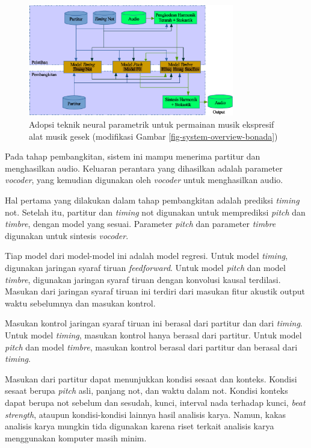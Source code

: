 \begin{figure}[h]
    \centering
    \includegraphics[width=0.8\textwidth]{resources/system-overview.eps}
    \caption{Adopsi teknik neural parametrik untuk permainan musik ekspresif alat musik gesek (modifikasi Gambar \ref{fig-system-overview-bonada})}\label{fig-system-overview}
\end{figure}

Pada tahap pembangkitan, sistem ini mampu menerima partitur dan menghasilkan audio. Keluaran perantara yang dihasilkan adalah parameter \textit{vocoder}, yang kemudian digunakan oleh \textit{vocoder} untuk menghasilkan audio.

Hal pertama yang dilakukan dalam tahap pembangkitan adalah prediksi \textit{timing} not. Setelah itu, partitur dan \textit{timing} not digunakan untuk memprediksi \textit{pitch} dan \textit{timbre}, dengan model yang sesuai. Parameter \textit{pitch} dan parameter \textit{timbre} digunakan untuk sintesis \textit{vocoder}.

Tiap model dari model-model ini adalah model regresi. Untuk model \textit{timing}, digunakan jaringan syaraf tiruan \textit{feedforward}. Untuk model \textit{pitch} dan model \textit{timbre}, digunakan jaringan syaraf tiruan dengan konvolusi kausal terdilasi. Masukan dari jaringan syaraf tiruan ini terdiri dari masukan fitur akustik output waktu sebelumnya dan masukan kontrol.

Masukan kontrol jaringan syaraf tiruan ini berasal dari partitur dan dari \textit{timing}. Untuk model \textit{timing}, masukan kontrol hanya berasal dari partitur. Untuk model \textit{pitch} dan model \textit{timbre}, masukan kontrol berasal dari partitur dan berasal dari \textit{timing}.

Masukan dari partitur dapat menunjukkan kondisi sesaat dan konteks. Kondisi sesaat berupa \textit{pitch} asli, panjang not, dan waktu dalam not. Kondisi konteks dapat berupa not sebelum dan sesudah, kunci, interval nada terhadap kunci, \textit{beat strength}, ataupun kondisi-kondisi lainnya hasil analisis karya. Namun, kakas analisis karya mungkin tida digunakan karena riset terkait analisis karya menggunakan komputer masih minim.

